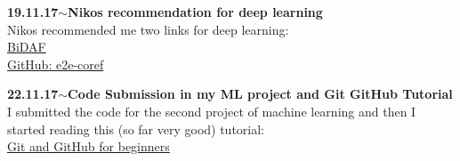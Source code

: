 \documentclass[11pt,a4paper]{article}
\newenvironment{loggentry}[2]%
{\noindent\textbf{#1}\hspace{1cm}$\mathbf{\sim}$\text{ }\textbf{#2}\\}{\vspace{0.5cm}}
\begin{document}
\begin{loggentry}{19.11.17}{Nikos recommendation for deep learning}
Nikos recommended me two links for deep learning:\\
\href{https://allenai.github.io/bi-att-flow/}{BiDAF}\\
\href{https://github.com/kentonl/e2e-coref}{GitHub: e2e-coref}\\
\end{loggentry}

\begin{loggentry}{22.11.17}{Code Submission in my ML project and Git GitHub Tutorial}
I submitted the code for the second project of machine learning and then I started reading this (so far very good) tutorial:\\
\href{https://readwrite.com/2013/09/30/understanding-github-a-journey-for-beginners-part-1/}{Git and GitHub for beginners}
\end{loggentry}
\end{document}
